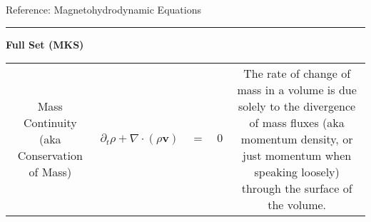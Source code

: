 


\huge{Reference: Magnetohydrodynamic Equations}
\rule{\textwidth}{1pt}
\normalsize


\textbf{Full Set (MKS)} \\  

\begin{tabular}{ | c | c | c | }
  Mass Continuity \newline (aka Conservation of Mass) & 
  $\partial_{t}\rho+\nabla\cdot\left(\rho\mathbf{v}\right)\quad=\quad 0$
  & The rate of change of mass in a volume is due solely to the
  divergence of mass fluxes (aka momentum density, or just momentum when 
  speaking loosely) through the surface of the volume. \\  
\end{tabular}









